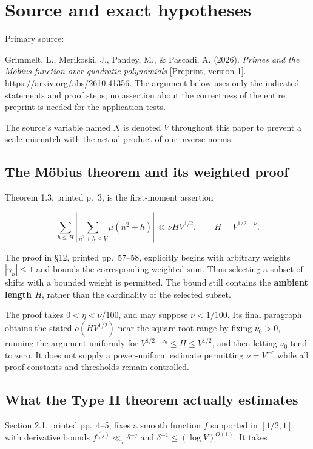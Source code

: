 \section{Source and exact hypotheses}\label{source-and-exact-hypotheses}

Primary source:

Grimmelt, L., Merikoski, J., Pandey, M., \& Pascadi, A. (2026).
\emph{Primes and the Möbius function over quadratic polynomials}
{[}Preprint, version 1{]}. https://arxiv.org/abs/2610.41356. The
argument below uses only the indicated statements and proof steps; no
assertion about the correctness of the entire preprint is needed for the
application tests.

The source's variable named \(X\) is denoted \(V\) throughout this paper
to prevent a scale mismatch with the actual product of our inverse
norms.

\subsection{The Möbius theorem and its weighted
proof}\label{the-muxf6bius-theorem-and-its-weighted-proof}

Theorem 1.3, printed p.~3, is the first-moment assertion

\[
\sum_{h\le H}\left|\sum_{n^2+h\le V}\mu(n^2+h)\right|
\ll \nu H V^{1/2},\qquad H=V^{1/2-\nu}.
\tag{1}
\]

The proof in §12, printed pp.~57--58, explicitly begins with arbitrary
weights \(|\gamma_h|\le1\) and bounds the corresponding weighted sum.
Thus selecting a subset of shifts with a bounded weight is permitted.
The bound still contains the \textbf{ambient length \(H\)}, rather than
the cardinality of the selected subset.

The proof takes \(0<\eta<\nu/100\), and may suppose \(\nu<1/100\). Its
final paragraph obtains the stated \(o(HV^{1/2})\) near the square-root
range by fixing \(\nu_0>0\), running the argument uniformly for
\(V^{1/2-\nu_0}\le H\le V^{1/2}\), and then letting \(\nu_0\) tend to
zero. It does not supply a power-uniform estimate permitting
\(\nu=V^{-c}\) while all proof constants and thresholds remain
controlled.

\subsection{What the Type II theorem actually
estimates}\label{what-the-type-ii-theorem-actually-estimates}

Section 2.1, printed pp.~4--5, fixes a smooth function \(f\) supported
in \([1/2,1]\), with derivative bounds \(f^{(j)}\ll_j\delta^{-j}\) and
\(\delta^{-1}\le(\log V)^{O(1)}\). It takes

